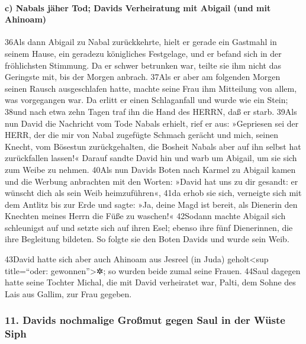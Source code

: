 \hypertarget{c-nabals-juxe4her-tod-davids-verheiratung-mit-abigail-und-mit-ahinoam}{%
\paragraph{c) Nabals jäher Tod; Davids Verheiratung mit Abigail (und mit
Ahinoam)}\label{c-nabals-juxe4her-tod-davids-verheiratung-mit-abigail-und-mit-ahinoam}}

36Als dann Abigail zu Nabal zurückkehrte, hielt er gerade ein Gastmahl
in seinem Hause, ein geradezu königliches Festgelage, und er befand sich
in der fröhlichsten Stimmung. Da er schwer betrunken war, teilte sie ihm
nicht das Geringste mit, bis der Morgen anbrach. 37Als er aber am
folgenden Morgen seinen Rausch ausgeschlafen hatte, machte seine Frau
ihm Mitteilung von allem, was vorgegangen war. Da erlitt er einen
Schlaganfall und wurde wie ein Stein; 38und nach etwa zehn Tagen traf
ihn die Hand des HERRN, daß er starb. 39Als nun David die Nachricht vom
Tode Nabals erhielt, rief er aus: »Gepriesen sei der HERR, der die mir
von Nabal zugefügte Schmach gerächt und mich, seinen Knecht, vom
Bösestun zurückgehalten, die Bosheit Nabals aber auf ihn selbst hat
zurückfallen lassen!« Darauf sandte David hin und warb um Abigail, um
sie sich zum Weibe zu nehmen. 40Als nun Davids Boten nach Karmel zu
Abigail kamen und die Werbung anbrachten mit den Worten: »David hat uns
zu dir gesandt: er wünscht dich als sein Weib heimzuführen«, 41da erhob
sie sich, verneigte sich mit dem Antlitz bis zur Erde und sagte: »Ja,
deine Magd ist bereit, als Dienerin den Knechten meines Herrn die Füße
zu waschen!« 42Sodann machte Abigail sich schleunigst auf und setzte
sich auf ihren Esel; ebenso ihre fünf Dienerinnen, die ihre Begleitung
bildeten. So folgte sie den Boten Davids und wurde sein Weib.

43David hatte sich aber auch Ahinoam aus Jesreel (in Juda)
geholt\textless sup title=``oder: gewonnen''\textgreater✲; so wurden
beide zumal seine Frauen. 44Saul dagegen hatte seine Tochter Michal, die
mit David verheiratet war, Palti, dem Sohne des Lais aus Gallim, zur
Frau gegeben.

\hypertarget{davids-nochmalige-grouxdfmut-gegen-saul-in-der-wuxfcste-siph}{%
\subsubsection{11. Davids nochmalige Großmut gegen Saul in der Wüste
Siph}\label{davids-nochmalige-grouxdfmut-gegen-saul-in-der-wuxfcste-siph}}


